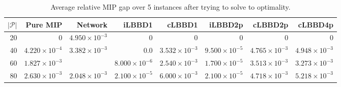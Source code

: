 \begin{table*}
    \centering
    \caption{Average relative MIP gap over 5 instances after trying to solve to optimality.}
    \begin{tabular}{rrrrrrrr} \toprule
        $|\mathcal{P}|$ & Pure MIP & Network & iLBBD1 & cLBBD1 & iLBBD2p & cLBBD2p & cLBBD4p \\ \midrule
        20              & 0 &    $4.950 \times 10^{-3}$     & 0 &  0 & 0 & 0 & 0 \\
        40              & $4.220 \times 10^{-4}$ & $3.382 \times 10^{-3}$  & 0.0 & $3.532 \times 10^{-3}$ & $9.500 \times 10^{-5}$ & $4.765 \times 10^{-3}$ & $4.948 \times 10^{-3}$ \\
        60 & $1.827 \times 10^{-3}$ &  & $8.000 \times 10^{-6}$ & $2.540 \times 10^{-3}$ & $1.700 \times 10^{-5}$ & $3.513 \times 10^{-3}$ & $3.273 \times 10^{-3}$ \\
        80 &  $2.630 \times 10^{-3}$ &  $2.048 \times 10^{-3}$ & $2.100 \times 10^{-5}$ &  $6.000 \times 10^{-3}$ & $2.100 \times 10^{-5}$ & $4.718 \times 10^{-3}$ & $5.218 \times 10^{-3}$ \\
        \bottomrule
    \end{tabular}
\end{table*}
